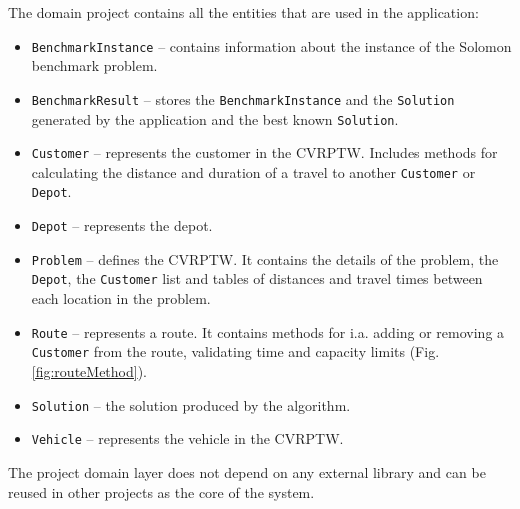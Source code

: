 \documentclass[a4paper,twoside,12pt]{book}
\begin{document}
The domain project contains all the entities that are used in the application: 
\begin{itemize}
    \item \lstinline|BenchmarkInstance| -- contains information about the instance of the Solomon benchmark problem.
    \item \lstinline|BenchmarkResult| -- stores the \lstinline|BenchmarkInstance| and the \lstinline|Solution| generated by the application and the best known \lstinline|Solution|.
    \item \lstinline|Customer| -- represents the customer in the CVRPTW. Includes methods for calculating the distance and duration of a travel to another \lstinline|Customer| or \lstinline|Depot|.
    \item \lstinline|Depot| -- represents the depot.
    \item \lstinline|Problem| -- defines the CVRPTW. It contains the details of the problem, the \lstinline|Depot|, the \lstinline|Customer| list and tables of distances and travel times between each location in the problem.
    \item \lstinline|Route| --  represents a route. It contains methods for i.a. adding or removing a \lstinline|Customer| from the route, validating time and capacity limits (Fig. \ref{fig:routeMethod}).
    \item \lstinline|Solution| -- the solution produced by the algorithm.
    \item \lstinline|Vehicle| --  represents the vehicle in the CVRPTW.   
\end{itemize}

The project domain layer does not depend on any external library and can be reused in other projects as the core of the system.
\end{document}
